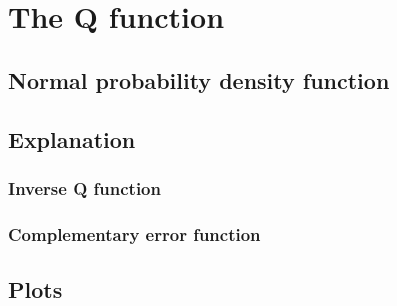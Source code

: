 \section{The Q function}

\subsection{Normal probability density function}



\subsection{Explanation}



\subsubsection{Inverse Q function}



\subsubsection{Complementary error function}



\subsection{Plots}
